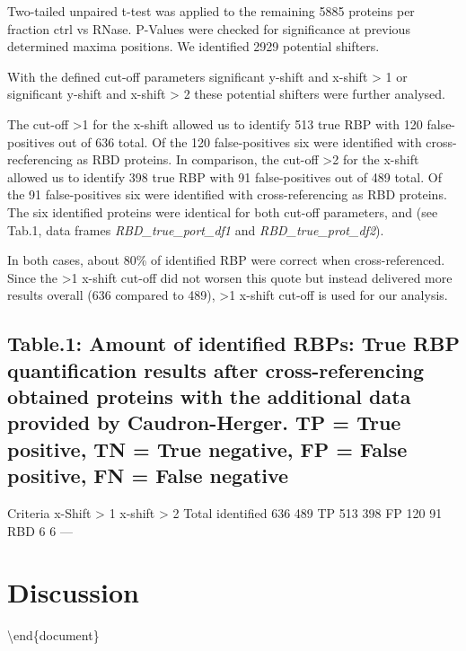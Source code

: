 \documentclass[
]{article}
\begin{document}
Two-tailed unpaired t-test was applied to the remaining 5885 proteins
per fraction ctrl vs RNase. P-Values were checked for significance at
previous determined maxima positions. We identified 2929 potential
shifters.

With the defined cut-off parameters significant y-shift and x-shift
\textgreater{} 1 or significant y-shift and x-shift \textgreater{} 2
these potential shifters were further analysed.

The cut-off \textgreater1 for the x-shift allowed us to identify 513
true RBP with 120 false-positives out of 636 total. Of the 120
false-positives six were identified with cross-recferencing as RBD
proteins. In comparison, the cut-off \textgreater2 for the x-shift
allowed us to identify 398 true RBP with 91 false-positives out of 489
total. Of the 91 false-positives six were identified with
cross-referencing as RBD proteins. The six identified proteins were
identical for both cut-off parameters, and (see Tab.1, data frames
\emph{RBD\_true\_port\_df1} and \emph{RBD\_true\_prot\_df2}).

In both cases, about 80\% of identified RBP were correct when
cross-referenced. Since the \textgreater1 x-shift cut-off did not worsen
this quote but instead delivered more results overall (636 compared to
489), \textgreater1 x-shift cut-off is used for our analysis.

\hypertarget{table.1-amount-of-identified-rbps-true-rbp-quantification-results-after-cross-referencing-obtained-proteins-with-the-additional-data-provided-by-caudron-herger.-tp-true-positive-tn-true-negative-fp-false-positive-fn-false-negative}{%
\subsection{\texorpdfstring{\textbf{Table.1: Amount of identified RBPs:}
True RBP quantification results after cross-referencing obtained
proteins with the additional data provided by Caudron-Herger. TP = True
positive, TN = True negative, FP = False positive, FN = False
negative}{Table.1: Amount of identified RBPs: True RBP quantification results after cross-referencing obtained proteins with the additional data provided by Caudron-Herger. TP = True positive, TN = True negative, FP = False positive, FN = False negative}}\label{table.1-amount-of-identified-rbps-true-rbp-quantification-results-after-cross-referencing-obtained-proteins-with-the-additional-data-provided-by-caudron-herger.-tp-true-positive-tn-true-negative-fp-false-positive-fn-false-negative}}

Criteria \textbar{} x-Shift \textgreater{} 1 \textbar{} x-shift
\textgreater{} 2 \textbar{} Total identified \textbar{} 636 \textbar{}
489 \textbar{} TP \textbar{} 513 \textbar{} 398 \textbar{} FP \textbar{}
120\textbar{} 91 \textbar{} RBD\textbar{} 6 \textbar{} 6\textbar{} ---

\hypertarget{discussion}{%
\section{Discussion}\label{discussion}}

\textbackslash end\{document\}
\end{document}
